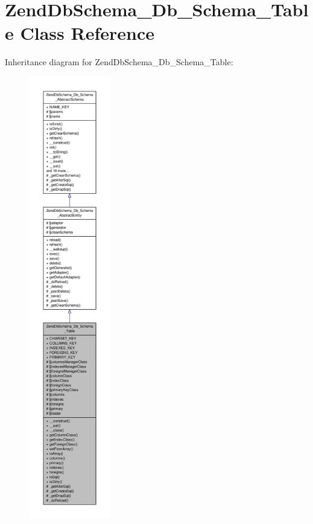 \hypertarget{classZendDbSchema__Db__Schema__Table}{\section{Zend\-Db\-Schema\-\_\-\-Db\-\_\-\-Schema\-\_\-\-Table Class Reference}
\label{classZendDbSchema__Db__Schema__Table}
}


Inheritance diagram for Zend\-Db\-Schema\-\_\-\-Db\-\_\-\-Schema\-\_\-\-Table\-:\nopagebreak
\begin{figure}[H]
\begin{center}
\leavevmode
\includegraphics[height=550pt]{classZendDbSchema__Db__Schema__Table__inherit__graph}
\end{center}
\end{figure}


